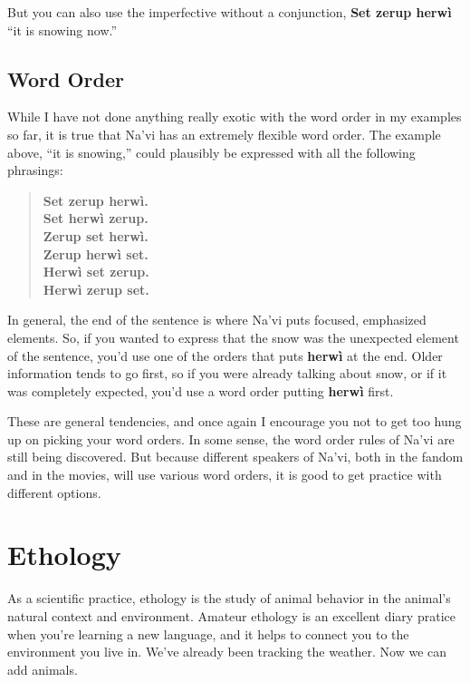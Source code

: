 \documentclass[nofonts]{tufte-handout}
\newcommand{\N}[1]{\textbf{\textcolor{navi}{#1}}}
\begin{document}
\noindent But you can also use the imperfective without a conjunction,
\N{Set zerup herwì} ``it is snowing now.''

\subsection*{Word Order}
While I have not done anything really exotic with the word order in my
examples so far, it is true that Na'vi has an extremely flexible word
order.  The example above, ``it is snowing,'' could plausibly be
expressed with all the following phrasings:

\begin{quotation}
  \noindent\N{Set zerup herwì.} \\
  \noindent\N{Set herwì zerup.} \\
  \noindent\N{Zerup set herwì.} \\
  \noindent\N{Zerup herwì set.} \\
  \noindent\N{Herwì set zerup.} \\
  \noindent\N{Herwì zerup set.}
\end{quotation}

\noindent In general, the end of the sentence is where Na'vi puts
focused, emphasized elements.  So, if you wanted to express that the
snow was the unexpected element of the sentence, you'd use one of the
orders that puts \N{herwì} at the end.  Older information
tends to go first, so if you were already talking about snow, or if it
was completely expected, you'd use a word order putting \N{herwì}
first.

These are general tendencies, and once again I encourage you not to
get too hung up on picking your word orders.  In some sense, the word
order rules of Na'vi are still being discovered.  But because
different speakers of Na'vi, both in the fandom and in the movies,
will use various word orders, it is good to get practice with
different options.


\section*{Ethology}
As a scientific practice, ethology is the study of animal behavior in
the animal's natural context and environment.  Amateur ethology is an
excellent diary pratice when you're learning a new language, and it
helps to connect you to the environment you live in.  We've already
been tracking the weather.  Now we can add animals.
\end{document}
